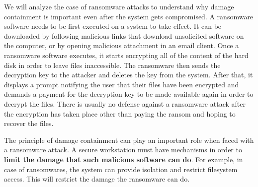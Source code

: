 We will analyze the case of ransomware attacks to understand why damage containment is important even after the system gets compromised. A ransomware software needs to be first executed on a system to take effect. It can be downloaded by following malicious links that download unsolicited software on the computer, or by opening malicious attachment in an email client. Once a ransomware software executes, it starts encrypting all of the content of the hard disk in order to leave files inaccessible. The ransomware then sends the decryption key to the attacker and deletes the key from the system. After that, it displays a prompt notifying the user that their files have been encrypted and demands a payment for the decryption key to be made available again in order to decrypt the files. There is usually no defense against a ransomware attack after the encryption has taken place other than paying the ransom and hoping to recover the files.

The principle of damage containment can play an important role when faced with a ransomware attack. A secure workstation must have mechanisms in order to \textbf{limit the damage that such malicious software can do}. For example, in case of ransomwares, the system can provide isolation and restrict filesystem access. This will restrict the damage the ransomware can do.